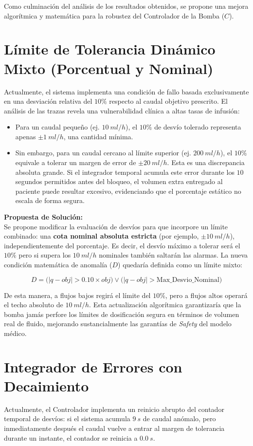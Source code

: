 Como culminación del análisis de los resultados obtenidos, se propone una mejora algorítmica y matemática para la robustez del Controlador de la Bomba ($C$).

\section{Límite de Tolerancia Dinámico Mixto (Porcentual y Nominal)}
Actualmente, el sistema implementa una condición de fallo basada exclusivamente en una desviación relativa del $10\%$ respecto al caudal objetivo prescrito. El análisis de las trazas revela una vulnerabilidad clínica a altas tasas de infusión:

\begin{itemize}
    \item Para un caudal pequeño (ej. $10~ml/h$), el $10\%$ de desvío tolerado representa apenas $\pm 1~ml/h$, una cantidad mínima.
    \item Sin embargo, para un caudal cercano al límite superior (ej. $200~ml/h$), el $10\%$ equivale a tolerar un margen de error de $\pm 20~ml/h$. Esta es una discrepancia absoluta grande. Si el integrador temporal acumula este error durante los $10$ segundos permitidos antes del bloqueo, el volumen extra entregado al paciente puede resultar excesivo, evidenciando que el porcentaje estático no escala de forma segura.
\end{itemize}

\textbf{Propuesta de Solución:} \\
Se propone modificar la evaluación de desvíos para que incorpore un límite combinado: una \textbf{cota nominal absoluta estricta} (por ejemplo, $\pm 10~ml/h$), independientemente del porcentaje. Es decir, el desvío máximo a tolerar será el $10\%$ pero si supera los $10~ml/h$ nominales también saltarán las alarmas. La nueva condición matemática de anomalía ($D$) quedaría definida como un límite mixto:

\[ D = \Big( |q - obj| > 0.10 \times obj \Big) \lor \Big( |q - obj| > \text{Max\_Desvio\_Nominal} \Big) \]

De esta manera, a flujos bajos regirá el límite del $10\%$, pero a flujos altos operará el techo absoluto de $10~ml/h$. Esta actualización algorítmica garantizaría que la bomba jamás perfore los límites de dosificación segura en términos de volumen real de fluido, mejorando sustancialmente las garantías de \textit{Safety} del modelo médico.

\section{Integrador de Errores con Decaimiento}
Actualmente, el Controlador implementa un reinicio abrupto del contador temporal de desvíos: si el sistema acumula $9~s$ de caudal anómalo, pero inmediatamente después el caudal vuelve a entrar al margen de tolerancia durante un instante, el contador se reinicia a $0.0~s$. 

